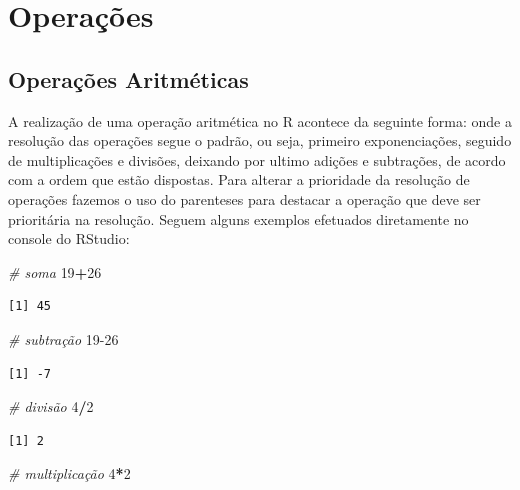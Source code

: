 \documentclass[12pt,brazil,oneside]{book}
\newenvironment{Shaded}{\begin{snugshade}}{\end{snugshade}}
\newcommand{\CommentTok}[1]{\textcolor[rgb]{0.56,0.35,0.01}{\textit{#1}}}
\newcommand{\DecValTok}[1]{\textcolor[rgb]{0.00,0.00,0.81}{#1}}
\newcommand{\OperatorTok}[1]{\textcolor[rgb]{0.81,0.36,0.00}{\textbf{#1}}}
\begin{document}
\hypertarget{operacoes}{%
\section{Operações}\label{operacoes}}

\hypertarget{operacoes-aritmeticas}{%
\subsection{Operações Aritméticas}\label{operacoes-aritmeticas}}

A realização de uma operação aritmética no R acontece da seguinte forma:
onde a resolução das operações segue o padrão, ou seja, primeiro
exponenciações, seguido de multiplicações e divisões, deixando por
ultimo adições e subtrações, de acordo com a ordem que estão dispostas.
Para alterar a prioridade da resolução de operações fazemos o uso do
parenteses para destacar a operação que deve ser prioritária na
resolução. Seguem alguns exemplos efetuados diretamente no console do
RStudio:

\begin{Shaded}
\begin{Highlighting}[]
\CommentTok{# soma}
\DecValTok{19}\OperatorTok{+}\DecValTok{26}
\end{Highlighting}
\end{Shaded}

\begin{verbatim}
[1] 45
\end{verbatim}

\begin{Shaded}
\begin{Highlighting}[]
\CommentTok{# subtração}
\DecValTok{19-26}
\end{Highlighting}
\end{Shaded}

\begin{verbatim}
[1] -7
\end{verbatim}

\begin{Shaded}
\begin{Highlighting}[]
\CommentTok{# divisão}
\DecValTok{4}\OperatorTok{/}\DecValTok{2}
\end{Highlighting}
\end{Shaded}

\begin{verbatim}
[1] 2
\end{verbatim}

\begin{Shaded}
\begin{Highlighting}[]
\CommentTok{# multiplicação }
\DecValTok{4}\OperatorTok{*}\DecValTok{2}
\end{Highlighting}
\end{Shaded}
\end{document}

